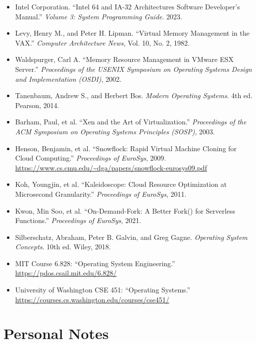 \documentclass[11pt]{article}
\begin{document}
\begin{itemize}
    \item Intel Corporation. ``Intel 64 and IA-32 Architectures Software Developer's Manual.'' \textit{Volume 3: System Programming Guide}. 2023.
    \item Levy, Henry M., and Peter H. Lipman. ``Virtual Memory Management in the VAX.'' \textit{Computer Architecture News}, Vol. 10, No. 2, 1982.
    \item Waldspurger, Carl A. ``Memory Resource Management in VMware ESX Server.'' \textit{Proceedings of the USENIX Symposium on Operating Systems Design and Implementation (OSDI)}, 2002.
    \item Tanenbaum, Andrew S., and Herbert Bos. \textit{Modern Operating Systems}. 4th ed. Pearson, 2014.
    \item Barham, Paul, et al. ``Xen and the Art of Virtualization.'' \textit{Proceedings of the ACM Symposium on Operating Systems Principles (SOSP)}, 2003.
    \item Henson, Benjamin, et al. ``Snowflock: Rapid Virtual Machine Cloning for Cloud Computing.'' \textit{Proceedings of EuroSys}, 2009. \url{https://www.cs.cmu.edu/~dga/papers/snowflock-eurosys09.pdf}
    \item Koh, Youngjin, et al. ``Kaleidoscope: Cloud Resource Optimization at Microsecond Granularity.'' \textit{Proceedings of EuroSys}, 2011.
    \item Kwon, Min Soo, et al. ``On-Demand-Fork: A Better Fork() for Serverless Functions.'' \textit{Proceedings of EuroSys}, 2021.
    \item Silberschatz, Abraham, Peter B. Galvin, and Greg Gagne. \textit{Operating System Concepts}. 10th ed. Wiley, 2018.
    \item MIT Course 6.828: ``Operating System Engineering.'' \url{https://pdos.csail.mit.edu/6.828/}
    \item University of Washington CSE 451: ``Operating Systems.'' \url{https://courses.cs.washington.edu/courses/cse451/}
\end{itemize}

\section*{Personal Notes}
\end{document}
